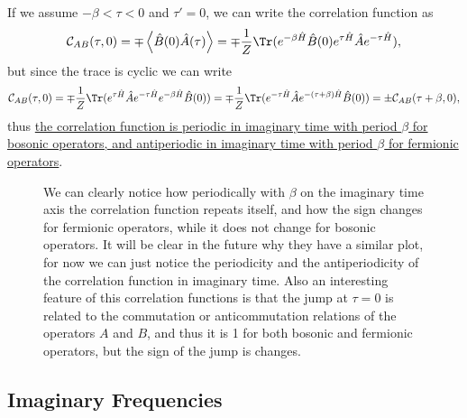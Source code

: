 If we assume \(- \beta < \tau < 0\) and \(\tau' = 0\), we can write the correlation function as
\[
    \mathcal{C}_{AB}(\tau, 0) = \mp \left\langle \hat{B}(0) \hat{A}(\tau) \right\rangle = \mp \frac{1}{Z} \Tr(e^{- \beta \hat{H}} \hat{B}(0) e^{ \tau \hat{H}}\hat{A}e^{- \tau \hat{H}}),
\]
but since the trace is cyclic we can write
\[
    \mathcal{C}_{AB}(\tau, 0) = \mp \frac{1}{Z} \Tr(e^{ \tau \hat{H}}\hat{A}e^{- \tau \hat{H}} e^{- \beta \hat{H}}\hat{B}(0)) = \mp \frac{1}{Z} \Tr(e^{- \tau \hat{H}} \hat{A} e^{-(\tau + \beta)\hat{H}} \hat{B}(0)) = \pm \mathcal{C}_{AB}(\tau + \beta, 0),
\]
thus \uline{the correlation function is periodic in imaginary time with period \(\beta\) for bosonic operators, and antiperiodic in imaginary time with period \(\beta\) for fermionic operators}. 
\begin{figure}[H]
    \begin{minipage}{0.6\textwidth}
        We can clearly notice how periodically with \(\beta\) on the imaginary time axis the correlation function repeats itself, and how the sign changes for fermionic operators, while it does not change for bosonic operators. It will be clear in the future why they have a similar plot, for now we can just notice the periodicity and the antiperiodicity of the correlation function in imaginary time. Also an interesting feature of this correlation functions is that the jump at \(\tau = 0\) is related to the commutation or anticommutation relations of the operators \(A\) and \(B\), and thus it is 1 for both bosonic and fermionic operators, but the sign of the jump is changes.
    \end{minipage}
    \hfill
    \begin{minipage}{0.35\textwidth}

    \end{minipage}
\end{figure}

\subsection{Imaginary Frequencies}

